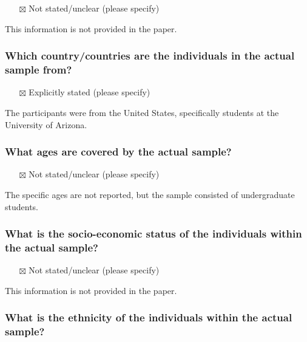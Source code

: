 \documentclass[
  doc, a4paper]{apa7}
\providecommand{\tightlist}{%
  \setlength{\itemsep}{0pt}\setlength{\parskip}{0pt}}
\begin{document}
\begin{itemize}
\tightlist
\item[$\boxtimes$]
  Not stated/unclear (please specify)
\end{itemize}

This information is not provided in the paper.

\subsubsection{Which country/countries are the individuals in the actual sample from?}\label{which-countrycountries-are-the-individuals-in-the-actual-sample-from}

\begin{itemize}
\tightlist
\item[$\boxtimes$]
  Explicitly stated (please specify)
\end{itemize}

The participants were from the United States, specifically students at the University of Arizona.

\subsubsection{What ages are covered by the actual sample?}\label{what-ages-are-covered-by-the-actual-sample}

\begin{itemize}
\tightlist
\item[$\boxtimes$]
  Not stated/unclear (please specify)
\end{itemize}

The specific ages are not reported, but the sample consisted of undergraduate students.

\subsubsection{What is the socio-economic status of the individuals within the actual sample?}\label{what-is-the-socio-economic-status-of-the-individuals-within-the-actual-sample}

\begin{itemize}
\tightlist
\item[$\boxtimes$]
  Not stated/unclear (please specify)
\end{itemize}

This information is not provided in the paper.

\subsubsection{What is the ethnicity of the individuals within the actual sample?}\label{what-is-the-ethnicity-of-the-individuals-within-the-actual-sample}
\end{document}
